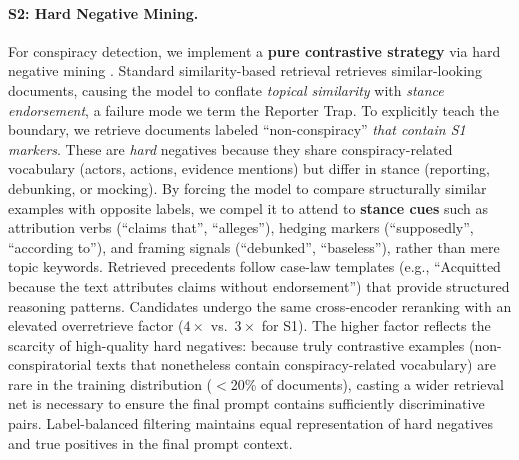 \documentclass[11pt]{article}
\begin{document}
\paragraph{S2: Hard Negative Mining.}
For conspiracy detection, we implement a \textbf{pure contrastive strategy} via hard negative mining \cite{karpukhin-etal-2020-dense}. Standard similarity-based retrieval retrieves similar-looking documents, causing the model to conflate \textit{topical similarity} with \textit{stance endorsement}, a failure mode we term the Reporter Trap. To explicitly teach the boundary, we retrieve documents labeled ``non-conspiracy'' \textit{that contain S1 markers}. These are \textit{hard} negatives because they share conspiracy-related vocabulary (actors, actions, evidence mentions) but differ in stance (reporting, debunking, or mocking). By forcing the model to compare structurally similar examples with opposite labels, we compel it to attend to \textbf{stance cues} such as attribution verbs (``claims that'', ``alleges''), hedging markers (``supposedly'', ``according to''), and framing signals (``debunked'', ``baseless''), rather than mere topic keywords. Retrieved precedents follow case-law templates (e.g., ``Acquitted because the text attributes claims without endorsement'') that provide structured reasoning patterns. Candidates undergo the same cross-encoder reranking with an elevated
overretrieve factor ($4\times$ vs.\ $3\times$ for S1). The higher factor
reflects the scarcity of high-quality hard negatives: because truly
contrastive examples (non-conspiratorial texts that nonetheless contain
conspiracy-related vocabulary) are rare in the training distribution
($<$20\% of documents), casting a wider retrieval net is necessary to ensure
the final prompt contains sufficiently discriminative pairs. Label-balanced
filtering maintains equal representation of hard negatives and true positives
in the final prompt context.
\end{document}
